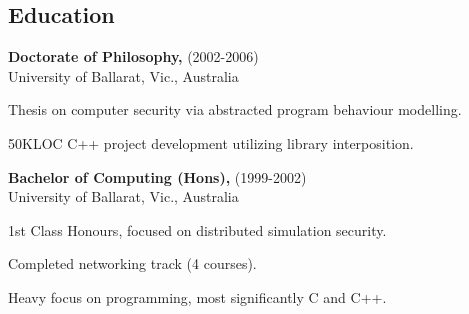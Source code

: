 \begin{resume}



\section{Education}

{\bf Doctorate of Philosophy,} (2002-2006) \\
University of Ballarat, Vic., Australia \\
\begin{description}
\item Thesis on computer security via abstracted program behaviour modelling.
\item 50KLOC C++ project development utilizing library interposition.
\end{description}

{\bf Bachelor of Computing (Hons),} (1999-2002) \\
University of Ballarat, Vic., Australia \\
\begin{description}
\item 1st Class Honours, focused on distributed simulation security.
\item Completed networking track (4 courses).
\item Heavy focus on programming, most significantly C and C++.
\end{description}








\end{resume}

